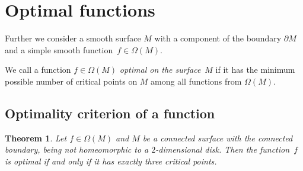 \documentclass[pdftex]{sigma}
\numberwithin{equation}{section}
\newtheorem{Theorem}{Theorem}[section]
\begin{document}
\section{Optimal functions}

Further we consider a smooth surface $M$ with a component of the boundary $\partial M$ and a simple smooth function~$f\in\Omega(M)$.

\begin{Definition}\label{definition4.1}
We call a function $f\in\Omega(M)$ \emph{optimal on the surface}~$M$ if it has the minimum possible number of critical points on $M$ among all functions from $\Omega(M)$.
\end{Definition}

\subsection{Optimality criterion of a function}

\begin{Theorem}\label{theorem4.1}
Let $f\in\Omega(M)$ and $M$ be a connected surface with the connected boundary, being not homeomorphic to a $2$-dimensional disk. Then the function~$f$ is optimal if and only if it has exactly three critical points.
\end{Theorem}
\end{document}
